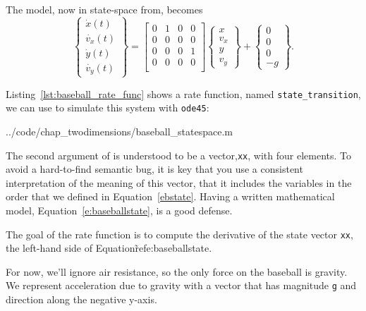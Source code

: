 The model, now in state-space from, becomes
\begin{equation}\label{e:baseballstate}
    \left\{ \begin{array}{c}
        \dot{x}(t) \\ \dot{v_x}(t)  \\ \dot{y}(t) \\ \dot{v_y}(t)
    \end{array}\right\}
    =
    \left[ \begin{array}{cccc}
        0  & 1 & 0 & 0\\
        0 & 0 & 0 & 0\\
        0 & 0 & 0 & 1\\
        0 & 0 & 0 & 0\\
    \end{array}
    \right]
    \left\{ \begin{array}{c}
        x \\ v_x  \\ y \\ v_y
    \end{array}\right\}
    +
    \left\{\begin{array}{c}
         0 \\ 0 \\ 0 \\ -g
    \end{array}
    \right\}
    .
\end{equation}

Listing~\ref{lst:baseball_rate_func} shows a rate function, named \lstinline{state_transition}, we can use to simulate this system with \lstinline{ode45}:


{../code/chap_twodimensions/baseball_statespace.m}

The second argument of is understood to be a vector,\lstinline{xx}, with four elements.  To avoid a hard-to-find semantic bug, it is key that you use a consistent interpretation of the meaning of this vector, that it includes the variables in the order that we defined in Equation~\ref{ebstate}.  Having a written mathematical model, Equation~\ref{e:baseballstate}, is a good defense.

The goal of the rate function is to compute the derivative of the state vector \lstinline{xx}, the left-hand side of Equation\~ref{e:baseballstate}.   

For now, we'll ignore air resistance, so the only force on the baseball is gravity.  We represent acceleration due to gravity with a vector that has magnitude \lstinline{g} and direction along the negative y-axis.

